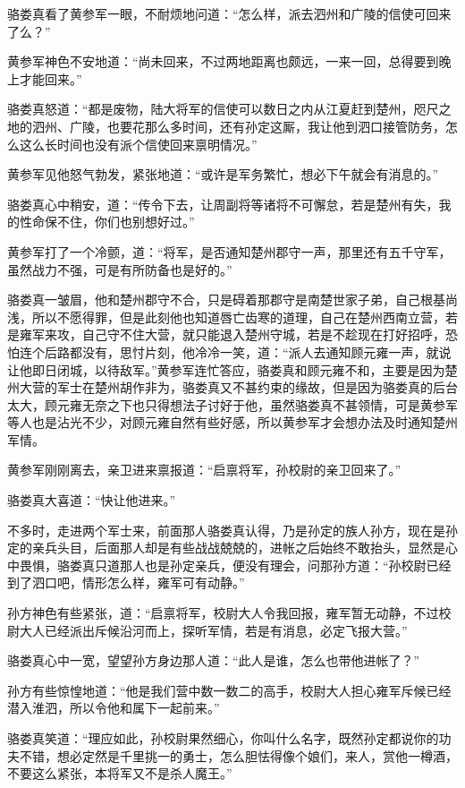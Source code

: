 骆娄真看了黄参军一眼，不耐烦地问道：“怎么样，派去泗州和广陵的信使可回来了么？”

黄参军神色不安地道：“尚未回来，不过两地距离也颇远，一来一回，总得要到晚上才能回来。”

骆娄真怒道：“都是废物，陆大将军的信使可以数日之内从江夏赶到楚州，咫尺之地的泗州、广陵，也要花那么多时间，还有孙定这厮，我让他到泗口接管防务，怎么这么长时间也没有派个信使回来禀明情况。”

黄参军见他怒气勃发，紧张地道：“或许是军务繁忙，想必下午就会有消息的。”

骆娄真心中稍安，道：“传令下去，让周副将等诸将不可懈怠，若是楚州有失，我的性命保不住，你们也别想好过。”

黄参军打了一个冷颤，道：“将军，是否通知楚州郡守一声，那里还有五千守军，虽然战力不强，可是有所防备也是好的。”

骆娄真一皱眉，他和楚州郡守不合，只是碍着那郡守是南楚世家子弟，自己根基尚浅，所以不愿得罪，但是此刻他也知道唇亡齿寒的道理，自己在楚州西南立营，若是雍军来攻，自己守不住大营，就只能退入楚州守城，若是不趁现在打好招呼，恐怕连个后路都没有，思忖片刻，他冷冷一笑，道：“派人去通知顾元雍一声，就说让他即日闭城，以待敌军。”黄参军连忙答应，骆娄真和顾元雍不和，主要是因为楚州大营的军士在楚州胡作非为，骆娄真又不甚约束的缘故，但是因为骆娄真的后台太大，顾元雍无奈之下也只得想法子讨好于他，虽然骆娄真不甚领情，可是黄参军等人也是沾光不少，对顾元雍自然有些好感，所以黄参军才会想办法及时通知楚州军情。

黄参军刚刚离去，亲卫进来禀报道：“启禀将军，孙校尉的亲卫回来了。”

骆娄真大喜道：“快让他进来。”

不多时，走进两个军士来，前面那人骆娄真认得，乃是孙定的族人孙方，现在是孙定的亲兵头目，后面那人却是有些战战兢兢的，进帐之后始终不敢抬头，显然是心中畏惧，骆娄真只道那人也是孙定亲兵，便没有理会，问那孙方道：“孙校尉已经到了泗口吧，情形怎么样，雍军可有动静。”

孙方神色有些紧张，道：“启禀将军，校尉大人令我回报，雍军暂无动静，不过校尉大人已经派出斥候沿河而上，探听军情，若是有消息，必定飞报大营。”

骆娄真心中一宽，望望孙方身边那人道：“此人是谁，怎么也带他进帐了？”

孙方有些惊惶地道：“他是我们营中数一数二的高手，校尉大人担心雍军斥候已经潜入淮泗，所以令他和属下一起前来。”

骆娄真笑道：“理应如此，孙校尉果然细心，你叫什么名字，既然孙定都说你的功夫不错，想必定然是千里挑一的勇士，怎么胆怯得像个娘们，来人，赏他一樽酒，不要这么紧张，本将军又不是杀人魔王。”

